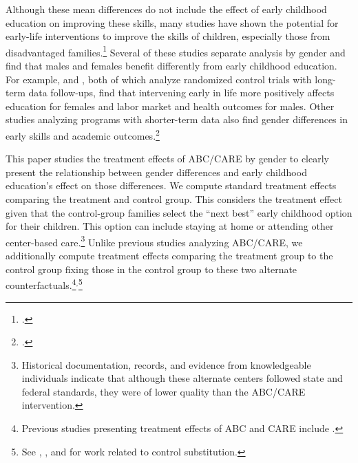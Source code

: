 Although these mean differences do not include the effect of early childhood education on improving these skills, many studies have shown the potential for early-life interventions to improve the skills of children, especially those from disadvantaged families.\footnote{\citet{Currie_2011_AER,Elango_Hojman_etal_2016_Early-Edu}.} Several of these studies separate analysis by gender and find that males and females benefit differently from early childhood education. For example, \citet{Heckman_Moon_etal_2010_QE} and \citet{Garcia_etal_2016_Comp_CBA_Unpublished}, both of which analyze randomized control trials with long-term data follow-ups, find that intervening early in life more positively affects education for females and labor market and health outcomes for males. Other studies analyzing programs with shorter-term data also find gender differences in early skills and academic outcomes.\footnote{\citet{Deming_2009_AEJAE,Ou_Reynolds_2010_Mechanisms_CYSR,Magnuson_Kelchen_Duncan_etal_2016_ECRQ}.} 

This paper studies the treatment effects of ABC/CARE by gender to clearly present the relationship between gender differences and early childhood education's effect on those differences. We compute standard treatment effects comparing the treatment and control group. This considers the treatment effect given that the control-group families select the ``next best'' early childhood option for their children. This option can include staying at home or attending other center-based care.\footnote{Historical documentation, records, and evidence from knowledgeable individuals indicate that although these alternate centers followed state and federal standards, they were of lower quality than the ABC/CARE intervention.} Unlike previous studies analyzing ABC/CARE, we additionally compute treatment effects comparing the treatment group to the control group fixing those in the control group to these two alternate counterfactuals.\footnote{Previous studies presenting treatment effects of ABC and CARE include \citet{Ramey_etal_1985_Project-CARE_TiECSE, Clarke_Campbell_1998_ABC_Comparison_ECRQ,Campbell_Pungello_etal_2001_DP,Campbell_Ramey_etal_2002_ADS,Campbell_Wasik_etal_2008_ECRQ,Campbell_Conti_etal_2014_EarlyChildhoodInvestments}.}$^,$\footnote{See \cite{Heckman_1992_randomization}, \cite{Heckman_Hohmann_etal_2000_QJE}, and \cite{Kline_Walters_2016_QJE} for work related to control substitution.} 

